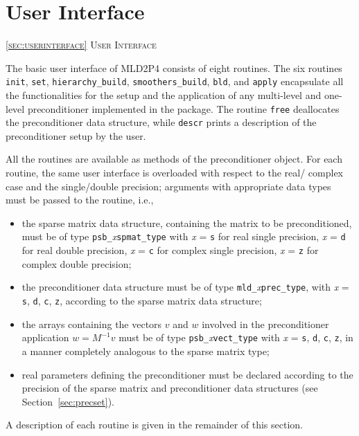\section{User Interface\label{sec:userinterface}}
         {\textsc{\ref{sec:userinterface} User Interface}}

The basic user interface of MLD2P4 consists of eight routines. The six
routines \verb|init|, \verb|set|,
\verb|hierarchy_build|, \verb|smoothers_build|,
\verb|bld|, and \verb|apply| encapsulate all the
functionalities for the setup and the application of any multi-level and one-level
preconditioner implemented in the package. 
The routine \verb|free| deallocates the preconditioner data structure, while
\verb|descr| prints a description of the preconditioner setup by the user.

All the routines are available as methods of the preconditioner object.
For each routine, the same user interface is overloaded with
respect to the real/ complex case and the single/double precision;
arguments with appropriate data types must be passed to the routine,
i.e.,
\begin{itemize}
\item the sparse matrix data structure, containing the matrix to be
  preconditioned, must be of type \verb|psb_|\emph{x}\verb|spmat_type|
	with \emph{x} = \verb|s| for real single precision, \emph{x} = \verb|d|
	for real double precision, \emph{x} = \verb|c| for complex single precision,
	\emph{x} = \verb|z| for complex double precision;
\item the preconditioner data structure must be of type
  \verb|mld_|\emph{x}\verb|prec_type|, with \emph{x} =    
  \verb|s|, \verb|d|, \verb|c|, \verb|z|, according to the sparse
  matrix data structure;
\item the arrays containing the vectors $v$ and $w$ involved in
  the preconditioner application $w=M^{-1}v$ must be of type   
  \verb|psb_|\emph{x}\verb|vect_type| with \emph{x} =    
  \verb|s|, \verb|d|, \verb|c|, \verb|z|, in a manner completely
  analogous to the sparse matrix type;
\item real parameters defining the preconditioner must be declared
  according to the precision of the sparse matrix and preconditioner
  data structures (see Section~\ref{sec:precset}).
\end{itemize}
A description of each routine is given in the remainder of this section.

\clearpage

